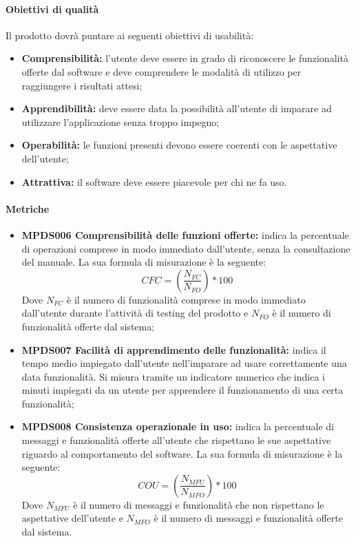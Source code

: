 \documentclass[NormeDiProgetto.tex]{subfiles}
\begin{document}
	\paragraph{Obiettivi di qualità}
	Il prodotto dovrà puntare ai seguenti obiettivi di usabilità:
	\begin{itemize}
		\item \textbf{Comprensibilità:} l'utente deve essere in grado di riconoscere le funzionalità offerte dal software e deve comprendere le modalità di utilizzo per raggiungere i risultati attesi;
		\item \textbf{Apprendibilità:} deve essere data la possibilità all'utente di imparare ad utilizzare l'applicazione senza troppo impegno;
		\item \textbf{Operabilità:} le funzioni presenti devono essere coerenti con le aspettative dell'utente;
		\item \textbf{Attrattiva:} il software deve essere piacevole per chi ne fa uso.
	\end{itemize}
	\paragraph{Metriche}
	\begin{itemize}
		\item \textbf{MPDS006 Comprensibilità delle funzioni offerte:} indica la percentuale di operazioni comprese in modo immediato dall'utente, senza la consultazione del manuale. La sua formula di misurazione è la seguente: \[CFC=(\frac{N_{FC}}{N_{FO}})*100\] Dove $ N_{FC} $ è il numero di funzionalità comprese in modo immediato dall'utente durante l'attività di testing del prodotto e $ N_{FO} $ è il numero di funzionalità offerte dal sistema;
		\item \textbf{MPDS007 Facilità di apprendimento delle funzionalità:} indica il tempo medio impiegato dall'utente nell'imparare ad usare correttamente una data funzionalità. Si misura tramite un indicatore numerico che indica i minuti impiegati da un utente per apprendere il funzionamento di una certa funzionalità;
		\item \textbf{MPDS008 Consistenza operazionale in uso:} indica la percentuale di messaggi e funzionalità offerte all'utente che rispettano le sue aspettative riguardo al comportamento del software. La sua formula di misurazione è la seguente: \[COU=(\frac{N_{MFU}}{N_{MFO}})*100\] Dove $ N_{MFU} $ è il numero di messaggi e funzionalità che non rispettano le aspettative dell'utente e $ N_{MFO} $ è il numero di messaggi e funzionalità offerte dal sistema.	
	\end{itemize}	
\end{document}

